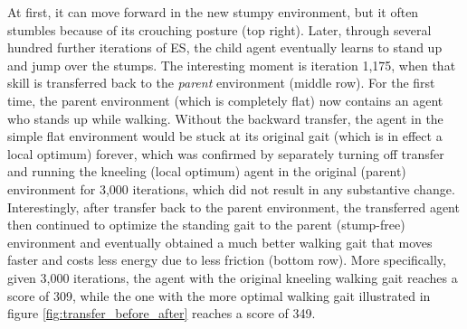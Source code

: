 \documentclass{article}
\newcommand{\jc}[1]{\comments{\textcolor{deepForestGreen}{[JC: #1]}}}
\newcommand{\ks}[1]{\comments{\textcolor{purple}{[Ken: #1]}}}
\newcommand{\rw}[1]{\comments{\textcolor{blue}{[Rui: #1]}}}
\newcommand{\comments}[1]{#1}
\begin{document}
At first, it can move forward in the new stumpy environment, but it often stumbles because of its crouching posture (top right). Later, through several hundred further iterations of ES, the child agent eventually learns to stand up and jump over the stumps.
The interesting moment is iteration 1,175, when that skill is transferred back to the \emph{parent} environment (middle row).  For the first time, the parent environment (which is completely flat) now contains an agent who stands up while walking.   Without the backward transfer, the agent in the simple flat environment would be stuck at its original gait (which is in effect a local optimum) forever, which was confirmed by separately turning off transfer and running the kneeling (local optimum) agent in the original (parent) environment for 3,000 iterations, which did not result in any substantive change.
Interestingly, after transfer back to the parent environment, the transferred agent then continued to optimize the standing gait to the parent (stump-free) environment and eventually obtained a much better walking gait that moves faster and costs less energy due to less friction (bottom row). More specifically, given 3,000 iterations, the agent with the original kneeling walking gait
reaches a score of 309, while the one with the more optimal walking gait illustrated in figure \ref{fig:transfer_before_after} reaches a score of 349.
\end{document}
